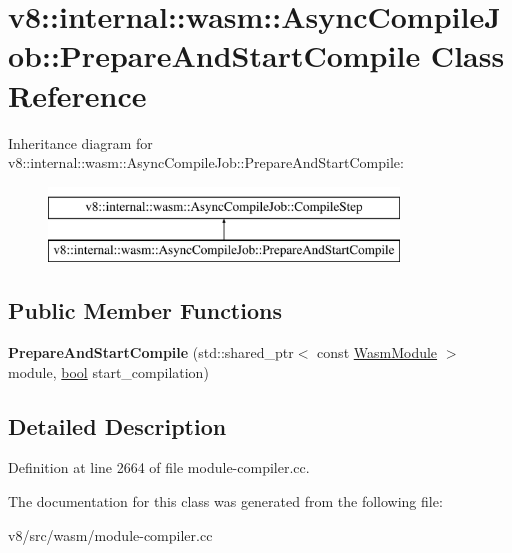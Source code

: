 \hypertarget{classv8_1_1internal_1_1wasm_1_1AsyncCompileJob_1_1PrepareAndStartCompile}{}\section{v8\+:\+:internal\+:\+:wasm\+:\+:Async\+Compile\+Job\+:\+:Prepare\+And\+Start\+Compile Class Reference}
\label{classv8_1_1internal_1_1wasm_1_1AsyncCompileJob_1_1PrepareAndStartCompile}
Inheritance diagram for v8\+:\+:internal\+:\+:wasm\+:\+:Async\+Compile\+Job\+:\+:Prepare\+And\+Start\+Compile\+:\begin{figure}[H]
\begin{center}
\leavevmode
\includegraphics[height=2.000000cm]{classv8_1_1internal_1_1wasm_1_1AsyncCompileJob_1_1PrepareAndStartCompile}
\end{center}
\end{figure}
\subsection*{Public Member Functions}
\begin{DoxyCompactItemize}
\item 
\mbox{\label{classv8_1_1internal_1_1wasm_1_1AsyncCompileJob_1_1PrepareAndStartCompile_ae874ba3ee119667160471d3d7702f3a3}} 
{\bfseries Prepare\+And\+Start\+Compile} (std\+::shared\+\_\+ptr$<$ const \mbox{\hyperlink{structv8_1_1internal_1_1wasm_1_1WasmModule}{Wasm\+Module}} $>$ module, \mbox{\hyperlink{classbool}{bool}} start\+\_\+compilation)
\end{DoxyCompactItemize}


\subsection{Detailed Description}


Definition at line 2664 of file module-\/compiler.\+cc.



The documentation for this class was generated from the following file\+:\begin{DoxyCompactItemize}
\item 
v8/src/wasm/module-\/compiler.\+cc\end{DoxyCompactItemize}
